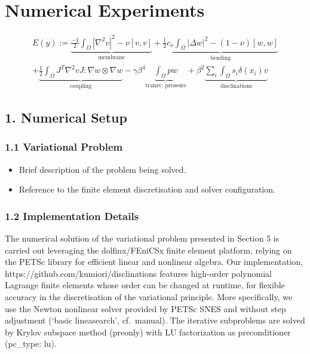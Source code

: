 \documentclass[
  11pt,
]{article}
\author{}
\date{}
\providecommand{\tightlist}{%
  \setlength{\itemsep}{0pt}\setlength{\parskip}{0pt}}
\begin{document}
\section{Numerical Experiments}\label{numerical-experiments}

\[
\begin{equation}
\begin{align}
E(y):=
\underbrace{\frac{-1}{2}\int_\Omega |\nabla^2 v|^2 - \nu [v, v]}_{\text{membrane}} +
\underbrace{\frac{1}{2}c_\nu\int_\Omega |\Delta w|^2 - (1-\nu) [w, w]}_{\text{bending}} \nonumber \\  +
\underbrace{\frac{1}{2 }\int_\Omega J^T \nabla^2 v J: \nabla w\otimes \nabla w}_{\text{coupling}} - \gamma \beta^4\underbrace{\int_\Omega p w }_{\text{transv. pressure}} + \beta^2\underbrace{ \sum_i\int_\Omega s_i \delta(x_i) v}_{\text{disclinations}}
\end{align}
\end{equation}
\]

\subsection{1. Numerical Setup}\label{numerical-setup}

\subsubsection{1.1 Variational Problem}\label{variational-problem}

\begin{itemize}
\tightlist
\item
  Brief description of the problem being solved.
\item
  Reference to the finite element discretisation and solver
  configuration.
\end{itemize}

\subsubsection{1.2 Implementation Details}\label{implementation-details}

The numerical solution of the variational problem presented in Section 5
is carried out leveraging the dolfinx/FEniCSx finite element platform,
relying on the PETSc library for efficient linear and nonlinear algebra.
Our implementation, https://github.com/kumiori/disclinations features
high-order polynomial Lagrange finite elements whose order can be
changed at runtime, for flexible accuracy in the discretisation of the
variational principle. More specifically, we use the Newton nonlinear
solver provided by PETSc SNES and without step adjustment (`basic
lineasearch', cf.~manual). The iterative subproblems are solved by
Krylov subspace method (preonly) with LU factorization as preconditioner
(pc\_type: lu).
\end{document}
